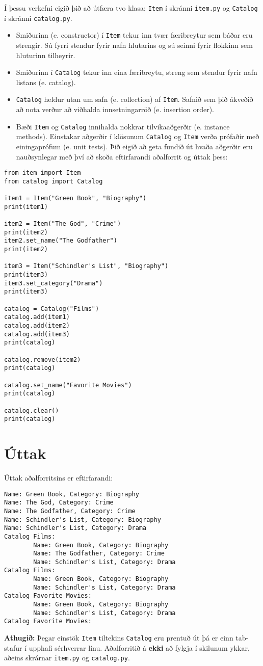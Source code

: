 
Í þessu verkefni eigið þið að útfæra tvo klasa: 
\texttt{Item} í skránni \texttt{item.py} og \texttt{Catalog} í skránni \texttt{catalog.py}.  
\begin{itemize}
    \item Smiðurinn (e. constructor) í \texttt{Item} tekur inn tvær færibreytur sem báðar eru strengir. Sú fyrri stendur fyrir nafn hlutarins og sú seinni fyrir flokkinn sem hluturinn tilheyrir.
    \item Smiðurinn í \texttt{Catalog} tekur inn eina færibreytu, streng sem stendur fyrir nafn listans (e. catalog).
    \item \texttt{Catalog} heldur utan um safn (e. collection) af \texttt{Item}. Safnið sem þið ákveðið að nota verður að viðhalda innsetningarröð (e. insertion order).
    \item Bæði \texttt{Item} og \texttt{Catalog} innihalda nokkrar tilvikaaðgerðir (e. instance methods). 
    Einstakar aðgerðir í klösunum \texttt{Catalog} og \texttt{Item} verða prófaðir með einingaprófum (e. unit tests). 
    Þið eigið að geta fundið út hvaða aðgerðir eru nauðsynlegar með því að skoða eftirfarandi aðalforrit og úttak þess:
\end{itemize}

\begin{verbatim}
from item import Item
from catalog import Catalog

item1 = Item("Green Book", "Biography")
print(item1)

item2 = Item("The God", "Crime")
print(item2)
item2.set_name("The Godfather")
print(item2)

item3 = Item("Schindler's List", "Biography")
print(item3)
item3.set_category("Drama")
print(item3)

catalog = Catalog("Films")
catalog.add(item1)
catalog.add(item2)
catalog.add(item3)
print(catalog)

catalog.remove(item2)
print(catalog)

catalog.set_name("Favorite Movies")
print(catalog)

catalog.clear()
print(catalog)
\end{verbatim}

\section*{Úttak}
Úttak aðalforritsins er eftirfarandi:
\begin{verbatim}
Name: Green Book, Category: Biography
Name: The God, Category: Crime
Name: The Godfather, Category: Crime
Name: Schindler's List, Category: Biography
Name: Schindler's List, Category: Drama
Catalog Films:
        Name: Green Book, Category: Biography
        Name: The Godfather, Category: Crime
        Name: Schindler's List, Category: Drama
Catalog Films:
        Name: Green Book, Category: Biography
        Name: Schindler's List, Category: Drama
Catalog Favorite Movies:
        Name: Green Book, Category: Biography
        Name: Schindler's List, Category: Drama
Catalog Favorite Movies:
\end{verbatim}

\textbf{Athugið:} Þegar einstök \texttt{Item} tiltekins \texttt{Catalog} eru prentuð út þá er einn tab-stafur í upphafi sérhverrar línu.
Aðalforritið á \textbf{ekki} að fylgja í skilunum ykkar, aðeins skrárnar \texttt{item.py} og \texttt{catalog.py}.